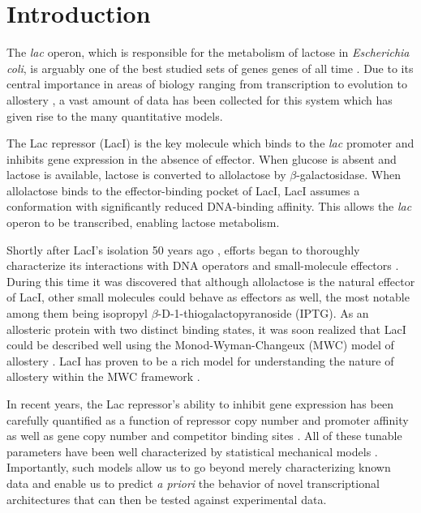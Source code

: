 \section*{Introduction }

The \textit{lac} operon, which is responsible for the metabolism of lactose in
\textit{Escherichia coli}, is arguably one of the best studied sets of genes genes of all time
\cite{MullerHill1996a}. Due to its central importance in areas of biology
ranging from transcription to evolution to allostery \cite{Razo-Mejia2014}
, a vast amount of data has been collected for this
system which has given rise to the many quantitative models. 

The Lac repressor (LacI) is the key molecule which binds to the \textit{lac} promoter and inhibits gene expression in the absence of effector. When glucose is absent and lactose is available, lactose is converted to allolactose by $\beta$-galactosidase. When allolactose binds to the effector-binding pocket of LacI, LacI assumes a conformation with significantly reduced DNA-binding affinity. This allows the \textit{lac} operon to be transcribed, enabling lactose metabolism.

Shortly after LacI's isolation 50 years ago \cite{Gilbert1966}, efforts began to thoroughly characterize its interactions with DNA operators and small-molecule effectors \cite{Riggs1970I, Riggs1970II, Riggs1970III, Jobe1972}. During this time it was discovered that although allolactose is the natural effector of LacI, other small molecules could behave as effectors as well, the most notable among them being isopropyl
$\beta$-D-1-thiogalactopyranoside (IPTG). As an allosteric protein with two distinct binding states, it was soon realized that LacI could be described well using the Monod-Wyman-Changeux (MWC) model of allostery \cite{MONOD1965}. LacI has proven to be a rich model for understanding the nature of allostery within the MWC framework \cite{Daly1986, Dunaway1980, Meyer2013, Daber2007, Daber2009, Muller-Hartmann1996, OGorman1980, Sharp2011, Taraban2008, Wilson2007}.

In recent years, the Lac repressor's ability to inhibit gene expression has been carefully quantified
as a function of repressor copy number and promoter affinity \cite{Garcia2011}
as well as gene copy number and competitor binding sites \cite{Weinert2014}. All
of these tunable parameters have been well characterized by statistical
mechanical models \cite{Bintu2005a, Bintu2005b}. Importantly, such models
allow us to go beyond merely characterizing known data and enable
us to predict \textit{a priori} the behavior of novel transcriptional architectures that can then be tested against experimental data.

